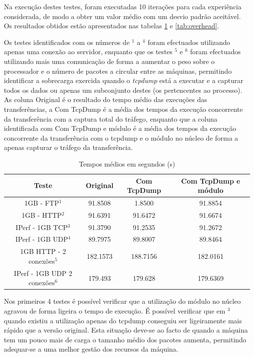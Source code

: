 \documentclass[a4paper]{llncs}
\begin{document}
Na execução destes testes, foram executadas 10 iterações para cada experiência considerada, de modo a obter um valor médio com um desvio padrão aceitável. Os resultados obtidos estão apresentados nas tabelas \ref{tab:desempenho} e \ref{tab:overhead}.

Os testes identificados com os números de $^{1}$ a $^{4}$ foram efectuados utilizando apenas uma conexão ao servidor, enquanto que os testes $^{5}$ e $^{6}$ foram efectuados utilizando mais uma comunicação de forma a aumentar o peso sobre o processador e o número de pacotes a circular entre as máquinas, permitindo identificar a sobrecarga exercida quando o \textit{tcpdump} está a executar e a capturar todos os dados ou apenas um subconjunto destes (os pertencentes ao processo). As coluna Original é o resultado do tempo médio das execuções das transferências, a Com TcpDump é a média dos tempos da execução concorrente da transferência com a captura total do tráfego, enquanto que a coluna identificada com Com TcpDump e módulo é a média dos tempos da execução concorrente da transferência com o tcpdump e o módulo no núcleo de forma a apenas capturar o tráfego da transferência.

\begin{table}
\begin{center}

\begin{tabular}{ | c | c | c | c |  }
\hline
Teste & \hspace {0.3cm} Original \hspace {0.3cm}& \hspace {0.2cm} Com TcpDump \hspace {0.2cm} & Com TcpDump e módulo \\
\hline
1GB - FTP$^{1}$ & 91.8508	& 1.8500 & 91.8854 \\
1GB - HTTP$^{2}$ & 91.6391 & 91.6472 & 91.6674 \\ 
IPerf - 1GB TCP$^{3}$ & 91.3790	& 91.2535	& 91.2672 \\
IPerf - 1GB UDP$^{4}$ & 89.7975 & 89.8007 & 89.8464 \\
\hline
\hline
1GB HTTP - 2 conexões$^{5}$ & 182.1573 & 188.7156 & 182.0161 \\
IPerf - 1GB UDP 2 conexões$^{6}$ & 179.493 & 179.628 & 179.6369 \\
\hline
\end{tabular}
\caption{Tempos médios em segundos (s)}
\label{tab:desempenho}
\end{center}
\end{table}

Nos primeiros 4 testes é possível verificar que a utilização do módulo no núcleo agravou de forma ligeira o tempo de execução. É possível verificar que em $^{3}$ quando existiu a utilização apenas do tcpdump conseguiu ser ligeiramente mais rápido que a versão original. Esta situação deve-se ao facto de quando a máquina tem um pouco mais de carga o tamanho médio dos pacotes aumenta, permitindo adequar-se a uma melhor gestão dos recursos da máquina.
\end{document}
